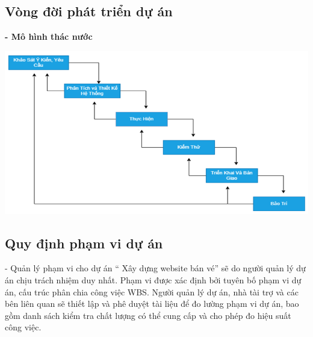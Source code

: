 \documentclass[12pt]{article}
\begin{document}
\subsection{Vòng đời phát triển dự án}
\hspace{1cm}\textbf{- Mô hình thác nước}
\par
\vspace{1cm}
\includegraphics[width=14cm]{mo_hinh_thac_nuoc.png}
\vspace{1cm}
\subsection{Quy định phạm vi dự án}
\hspace{1cm}- Quản lý phạm vi cho dự án “ Xây dựng website bán vé” sẽ do người quản lý dự án chịu trách nhiệm duy nhất. Phạm vi được xác định bởi tuyên bố phạm vi dự án, cấu trúc phân chia công việc WBS. Người quản lý dự án, nhà tài trợ và các bên liên quan sẽ thiết lập và phê duyệt tài liệu để đo lường phạm vi dự án, bao gồm danh sách kiểm tra chất lượng có thể cung cấp và cho phép đo hiệu suất công việc.
\end{document}
